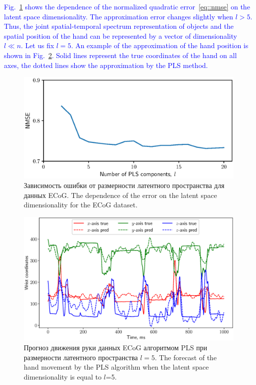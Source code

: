 \documentclass[12pt,twoside]{article}
\begin{document}
\textcolor{blue}{
Fig.~\ref{fig::ecog_n_comp} shows the dependence of the normalized quadratic error~\eqref{eq::nmse} on the latent space dimensionality. The approximation error changes slightly when $l > 5$.
Thus, the joint spatial-temporal spectrum representation of objects and the spatial position of the hand can be represented by a vector of dimensionality $l \ll n$.
Let us fix $l = 5$. 
An example of the approximation of the hand position is shown in Fig.~\ref{fig::ecog_prediction}. 
Solid lines represent the true coordinates of the hand on all axes, the dotted lines show the approximation by the PLS method.}
 
\begin{figure}[!h]
	\centering
	\includegraphics[width=0.75\linewidth]{figs/ecog_n_comp}	
	\caption{Зависимость ошибки от размерности латентного пространства для данных ECoG. The dependence of the error on the latent space dimensionality for the ECoG dataset.}
	\label{fig::ecog_n_comp}
\end{figure}

\begin{figure}[!h]
	\centering
	\includegraphics[width=\textwidth]{figs/ecog_prediction}
	\caption{Прогноз движения руки данных ECoG алгоритмом PLS при размерности латентного пространства $l=5$. The forecast of 
	the hand movement by the PLS algorithm when the latent space dimensionality is equal to $l$=5.}
	\label{fig::ecog_prediction}
\end{figure}
\end{document}
